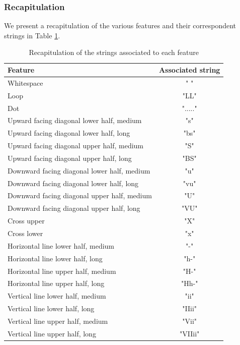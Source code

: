 \subsubsection*{Recapitulation}
We present a recapitulation of the various features and their correspondent strings in Table \ref{features}.
\begin{table}[H]
\centering
\footnotesize
\begin{tabular}{|l | c |} 
 \hline  \multicolumn{1}{|p{2cm}|}{\bfseries Feature}
 & \multicolumn{1}{p{2cm}|}{\centering\bfseries Associated string} \\ [0.5ex] 
 \hline\hline
 Whitespace & " " \\ \hline
 Loop & "LL"\\\hline
 Dot & "....."\\ \hline
 Upward facing diagonal lower half, medium & "s" \\ \hline
 Upward facing diagonal lower half, long & "bs"  \\\hline
 Upward facing diagonal upper half, medium & "S" \\ \hline
 Upward facing diagonal upper half, long & "BS" \\\hline
 Downward facing diagonal lower half, medium& "u"\\ \hline
 Downward facing diagonal lower half, long &"vu" \\ \hline
 Downward facing diagonal upper half, medium& "U" \\\hline
 Downward facing diagonal upper half, long &"VU" \\\hline
 Cross upper & "X"\\\hline
 Cross lower & "x"\\\hline
 Horizontal line lower half, medium & "-"\\\hline
  Horizontal line lower half, long & "h-"\\\hline
   Horizontal line upper half, medium & "H-"\\\hline
    Horizontal line upper half, long & "Hh-"\\\hline
 Vertical line lower half, medium & "ii"\\\hline
  Vertical line lower half, long & "IIii"\\\hline
   Vertical line upper half, medium & "Vii"\\\hline
    Vertical line upper half, long & "VIIii"\\ 
 \hline
\end{tabular}
\caption{Recapitulation of the strings associated to each feature}
\label{features}
\end{table}




